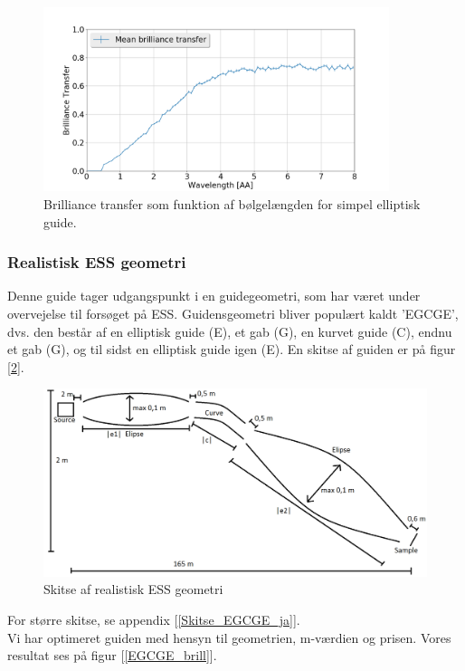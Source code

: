 \documentclass[12pt,oneside,a4paper]{article}
\begin{document}
{{{{{\begin{figure}[H]
\centering
\includegraphics[width=0.9\textwidth]{optimized_mean_4.png}
\caption{Brilliance transfer som funktion af bølgelængden for simpel elliptisk guide.} \label{simpel_guide}
\end{figure}


\subsubsection{Realistisk ESS geometri}
Denne guide tager udgangspunkt i en guidegeometri, som har været under overvejelse til forsøget på ESS. Guidensgeometri bliver populært kaldt 'EGCGE', dvs. den består af en elliptisk guide (E), et gab (G), en kurvet guide (C), endnu et gab (G), og til sidst en elliptisk guide igen (E). En skitse af guiden er på figur [\ref{EGCGE}].

\begin{figure}[H]
\centering
\includegraphics[width=1\textwidth]{EGCGE.png}
\caption{Skitse af realistisk ESS geometri} \label{EGCGE}
\end{figure}
For større skitse, se appendix [\ref{Skitse_EGCGE_ja}]. \\
Vi har optimeret guiden med hensyn til geometrien, m-værdien og prisen. Vores resultat ses på figur [\ref{EGCGE_brill}].

}}}}}
\end{document}
